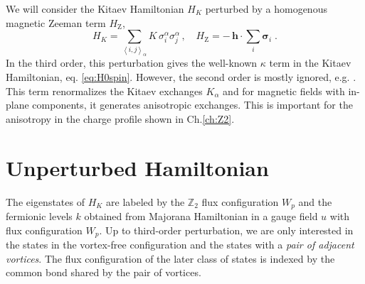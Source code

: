 

We will consider the Kitaev Hamiltonian $H_K$  perturbed by a homogenous magnetic Zeeman term $H_{\text{Z}}$,
\begin{equation}
    H_{K} = \sum_{\left< i,j\right>_\alpha}       K \, \sigma_i^\alpha  \sigma_j^\alpha
    \, , \quad  H_{\text{Z}} =
    - \, \mathbf{h} \cdot  \sum_{i}        \bm{\sigma}_i  \; .
    \label{C:Ham}
\end{equation}
In the third order, this perturbation gives the well-known $\kappa$ term in the Kitaev Hamiltonian, eq. \eqref{eq:H0spin}. However, the second order is mostly ignored, e.g. \cite{Kitaev2006}. This term renormalizes the Kitaev exchanges $K_\alpha$ and for magnetic fields with in-plane components, it generates anisotropic exchanges. This is important for the anisotropy in the charge profile shown in Ch.\ref{ch:Z2}.

\section{Unperturbed Hamiltonian}

The eigenstates of $H_K$ are labeled by the $\mathbb{Z}_2$ flux configuration $W_p$ and the fermionic levels $k$ obtained from Majorana Hamiltonian in a gauge field $u$ with flux configuration $W_p$. Up to third-order perturbation, we are only interested in the states in the vortex-free configuration and the states with a \textit{pair of adjacent vortices}. The flux configuration of the later class of states is indexed by the common bond shared by the pair of vortices.

